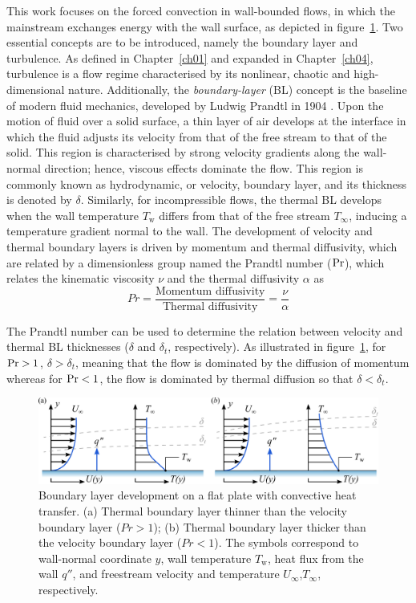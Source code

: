 This work focuses on the forced convection in wall-bounded flows, in which the mainstream exchanges energy with the wall surface, as depicted in figure~\ref{fig:dibujo_ThBL}. Two essential concepts are to be introduced, namely the boundary layer and turbulence. As defined in Chapter~\ref{ch01} and expanded in Chapter~\ref{ch04}, turbulence is a flow regime characterised by its nonlinear, chaotic and high-dimensional nature. Additionally, the \textit{boundary-layer} (BL) concept is the baseline of modern fluid mechanics, developed by Ludwig Prandtl in 1904 \citep{prandtl1904BL}. Upon the motion of fluid over a solid surface, a thin layer of air develops at the interface in which the fluid adjusts its velocity from that of the free stream to that of the solid. This region is characterised by strong velocity gradients along the wall-normal direction; hence, viscous effects dominate the flow. This region is commonly known as hydrodynamic, or velocity, boundary layer, and its thickness is denoted by $\delta$. 
Similarly, for incompressible flows, the thermal BL develops when the wall temperature $T_\mathrm{w}$ differs from that of the free stream $T_\infty$, inducing a temperature gradient normal to the wall. The development of velocity and thermal boundary layers is driven by momentum and thermal diffusivity, which are related by a dimensionless group named the Prandtl number ($\mbox{$\mathrm{Pr}$}$), which relates the kinematic viscosity $\nu$ and the thermal diffusivity $\alpha$ as
\begin{equation}
    Pr = \frac{\text{Momentum diffusivity}}{\text{Thermal diffusivity}} = \frac{\nu}{\alpha}
\end{equation}

The Prandtl number can be used to determine the relation between velocity and thermal BL thicknesses ($\delta$ and $\delta_t$, respectively). As illustrated in figure~\ref{fig:dibujo_ThBL}, for $\mbox{$\mathrm{Pr}$} >1$, $\delta > \delta_t$, meaning that the flow is dominated by the diffusion of momentum whereas for $\mbox{$\mathrm{Pr}$} < 1$, the flow is dominated by thermal diffusion so that $\delta < \delta_t$.

\begin{figure}
    \centering
    \includegraphics[width = 0.8\linewidth]{figures/dibujo_ThBL.pdf}
    \caption{Boundary layer development on a flat plate with convective heat transfer. (a) Thermal boundary layer thinner than the velocity boundary layer ($Pr > 1$); (b) Thermal boundary layer thicker than the velocity boundary layer ($Pr < 1$). The symbols correspond to wall-normal coordinate $y$, wall temperature $T_\mathrm{w}$, heat flux from the wall $q''$, and freestream velocity and temperature $U_\infty$,$T_\infty$, respectively.}
    \label{fig:dibujo_ThBL}
\end{figure}

